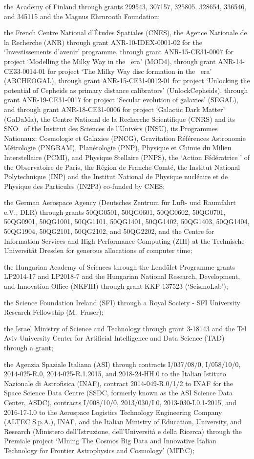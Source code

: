 the Academy of Finland through grants 299543, 307157, 325805, 328654, 336546, and 345115 and the Magnus Ehrnrooth Foundation;

the French Centre National d'\'{E}tudes Spatiales (CNES), the Agence Nationale de la Recherche (ANR) through grant ANR-10-IDEX-0001-02 for the `Investissements d'avenir' programme, through grant ANR-15-CE31-0007 for project `Modelling the Milky Way in the \gaia\ era' (MOD4\gaia), through grant ANR-14-CE33-0014-01 for project `The Milky Way disc formation in the \gaia\ era' (ARCHEOGAL), through grant ANR-15-CE31-0012-01 for project `Unlocking the potential of Cepheids as primary distance calibrators' (UnlockCepheids), through grant ANR-19-CE31-0017 for project `Secular evolution of galaxies' (SEGAL), and through grant ANR-18-CE31-0006 for project `Galactic Dark Matter' (GaDaMa), the Centre National de la Recherche Scientifique (CNRS) and its SNO \gaia\ of the Institut des Sciences de l'Univers (INSU), its Programmes Nationaux: Cosmologie et Galaxies (PNCG), Gravitation R\'{e}f\'{e}rences Astronomie M\'{e}trologie (PNGRAM), Plan\'{e}tologie (PNP), Physique et Chimie du Milieu Interstellaire (PCMI), and Physique Stellaire (PNPS), the `Action F\'{e}d\'{e}ratrice \gaia' of the Observatoire de Paris, the R\'{e}gion de Franche-Comt\'{e}, the Institut National Polytechnique (INP) and the Institut National de Physique nucl\'{e}aire et de Physique des Particules (IN2P3) co-funded by CNES;

the German Aerospace Agency (Deutsches Zentrum f\"{u}r Luft- und Raumfahrt e.V., DLR) through grants 50QG0501, 50QG0601, 50QG0602, 50QG0701, 50QG0901, 50QG1001, 50QG1101, 50\-QG1401, 50QG1402, 50QG1403, 50QG1404, 50QG1904, 50QG2101, 50QG2102, and 50QG2202, and the Centre for Information Services and High Performance Computing (ZIH) at the Technische Universit\"{a}t Dresden for generous allocations of computer time;

the Hungarian Academy of Sciences through the Lend\"{u}let Programme grants LP2014-17 and LP2018-7 and the Hungarian National Research, Development, and Innovation Office (NKFIH) through grant KKP-137523 (`SeismoLab');

the Science Foundation Ireland (SFI) through a Royal Society - SFI University Research Fellowship (M.~Fraser);

the Israel Ministry of Science and Technology through grant 3-18143 and the Tel Aviv University Center for Artificial Intelligence and Data Science (TAD) through a grant;

the Agenzia Spaziale Italiana (ASI) through contracts I/037/08/0, I/058/10/0, 2014-025-R.0, 2014-025-R.1.2015, and 2018-24-HH.0 to the Italian Istituto Nazionale di Astrofisica (INAF), contract 2014-049-R.0/1/2 to INAF for the Space Science Data Centre (SSDC, formerly known as the ASI Science Data Center, ASDC), contracts I/008/10/0, 2013/030/I.0, 2013-030-I.0.1-2015, and 2016-17-I.0 to the Aerospace Logistics Technology Engineering Company (ALTEC S.p.A.), INAF, and the Italian Ministry of Education, University, and Research (Ministero dell'Istruzione, dell'Universit\`{a} e della Ricerca) through the Premiale project `MIning The Cosmos Big Data and Innovative Italian Technology for Frontier Astrophysics and Cosmology' (MITiC);

